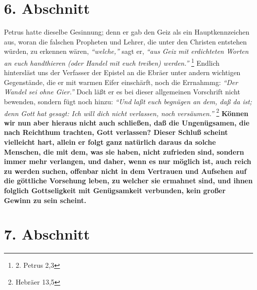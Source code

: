 \section{6. Abschnitt} \label{kap13_ab6}

Petrus  hatte dieselbe Gesinnung; denn er gab den Geiz
als ein Hauptkennzeichen
aus, woran die falschen Propheten und Lehrer,
die unter den Christen entstehen
würden, zu erkennen wären,  \textit{"`welche,"'} sagt er, \textit{"`aus Geiz mit
erdichteten
Worten an euch handthieren (oder Handel mit euch treiben) werden."'}
\footnote{2. Petrus 2,3}
Endlich hintersläst uns der Verfasser der Epistel an die Ebräer
unter andern wichtigen Gegenstände, die er mit warmen Eifer einschärft, noch die
Errnahmmg: \textit{"`Der Wandel sei ohne Gier."'} Doch läßt er es bei dieser
allgemeinen
Vorschrift nicht bewenden, sondern fügt noch hinzu:
\textit{"`Und laßt euch begnügen an
dem, daß da ist; denn Gott hat gesagt: Ich will dich nicht verlassen, noch
versäumen."'}
\footnote{Hebräer 13,5}
 \label{ref:13_06_reichtum_unersaettlichkeit}
\textbf{Können wir nun aber hieraus nicht auch
schließen, daß die Ungenügsamen, die nach
Reichthum trachten, Gott verlassen?
Dieser Schluß scheint vielleicht hart, allein er folgt ganz natürlich daraus da
solche Menschen, die mit dem, was sie haben, nicht zufrieden sind, sondern immer
mehr verlangen, und daher, wenn es nur möglich ist, auch reich zu werden suchen,
offenbar nicht in dem Vertrauen und Aufsehen auf die göttliche Vorsehung leben,
zu welcher sie ermahnet sind, und ihnen folglich Gottseligkeit mit Genügsamkeit
verbunden, kein großer Gewinn zu sein scheint.}

\section{7. Abschnitt} \label{kap13_ab7}

